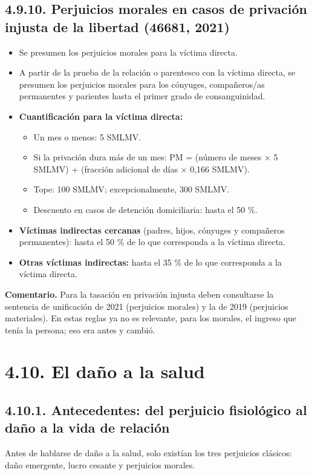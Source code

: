 \subsection{4.9.10. Perjuicios morales en casos de privación injusta de la libertad (46681, 2021)}
\begin{itemize}
\item Se presumen los perjuicios morales para la víctima directa.
\item A partir de la prueba de la relación o parentesco con la víctima directa, se presumen los perjuicios morales para los cónyuges, compañeros/as permanentes y parientes hasta el primer grado de consanguinidad.
\item \textbf{Cuantificación para la víctima directa:}
\begin{itemize}
\item Un mes o menos: 5 SMLMV.
\item Si la privación dura más de un mes: PM = (número de meses × 5 SMLMV) + (fracción adicional de días × 0,166 SMLMV).
\item Tope: 100 SMLMV; excepcionalmente, 300 SMLMV.
\item Descuento en casos de detención domiciliaria: hasta el 50 \%.
\end{itemize}
\item \textbf{Víctimas indirectas cercanas} (padres, hijos, cónyuges y compañeros permanentes): hasta el 50 \% de lo que corresponda a la víctima directa.
\item \textbf{Otras víctimas indirectas:} hasta el 35 \% de lo que corresponda a la víctima directa.
\end{itemize}
\begin{comentario}
\textcolor[HTML]{8A6D3B}{\textbf{Comentario. }}Para la tasación en privación injusta deben consultarse la sentencia de unificación de 2021 (perjuicios morales) y la de 2019 (perjuicios materiales). En estas reglas ya no es relevante, para los morales, el ingreso que tenía la persona; eso era antes y cambió.
\end{comentario}
\section{4.10. El daño a la salud}
\subsection{4.10.1. Antecedentes: del perjuicio fisiológico al daño a la vida de relación}
Antes de hablarse de daño a la salud, solo existían los tres perjuicios clásicos: daño emergente, lucro cesante y perjuicios morales.

